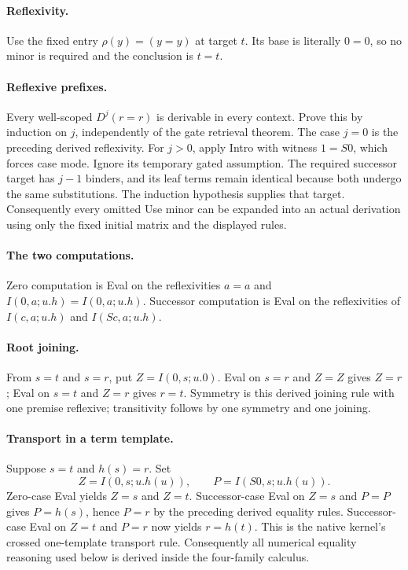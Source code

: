 \documentclass[11pt]{article}
\theoremstyle{definition}\newtheorem{definition}[theorem]{Definition}
\theoremstyle{remark}\newtheorem{remark}[theorem]{Remark}
\begin{document}
\paragraph{Reflexivity.}
Use the fixed entry $\rho(y)=(y=y)$ at target $t$.  Its base is literally
$0=0$, so no minor is required and the conclusion is $t=t$.


\paragraph{Reflexive prefixes.}
Every well-scoped $D^j(r=r)$ is derivable in every context.  Prove this
by induction on $j$, independently of the gate retrieval theorem.  The
case $j=0$ is the preceding derived reflexivity.  For $j>0$, apply Intro
with witness $1=S0$, which forces case mode.  Ignore its temporary gated
assumption.  The required successor target has $j-1$ binders, and its
leaf terms remain identical because both undergo the same substitutions.
The induction hypothesis supplies that target.  Consequently every
omitted Use minor can be expanded into an actual derivation using only
the fixed initial matrix and the displayed rules.

\paragraph{The two computations.}
Zero computation is Eval on the reflexivities $a=a$ and
$I(0,a;u.h)=I(0,a;u.h)$.  Successor computation is Eval on the
reflexivities of $I(c,a;u.h)$ and $I(Sc,a;u.h)$.

\paragraph{Root joining.}
From $s=t$ and $s=r$, put $Z=I(0,s;u.0)$.  Eval on $s=r$ and $Z=Z$
gives $Z=r$; Eval on $s=t$ and $Z=r$ gives $r=t$.  Symmetry is this
derived joining rule with one premise reflexive; transitivity follows by
one symmetry and one joining.

\paragraph{Transport in a term template.}
Suppose $s=t$ and $h(s)=r$.  Set
\[
 Z=I(0,s;u.h(u)),\qquad P=I(S0,s;u.h(u)).
\]
Zero-case Eval yields $Z=s$ and $Z=t$.  Successor-case Eval on $Z=s$
and $P=P$ gives $P=h(s)$, hence $P=r$ by the preceding derived equality
rules.  Successor-case Eval on $Z=t$ and $P=r$ now yields $r=h(t)$.
This is the native kernel's crossed one-template transport rule.
Consequently all numerical equality reasoning used below is derived
inside the four-family calculus.
\end{document}
